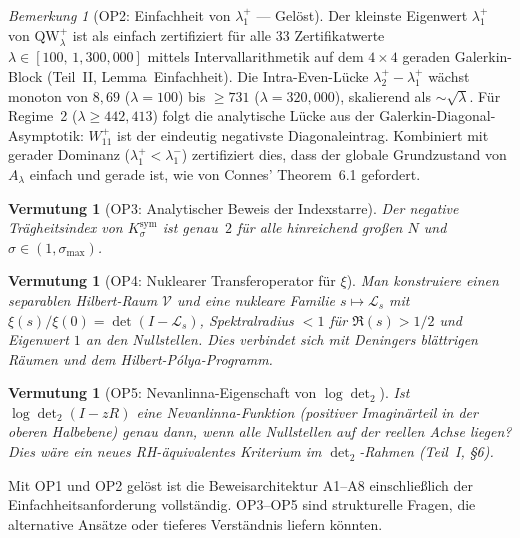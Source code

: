 \documentclass[12pt,a4paper]{article}
\newtheorem{conjecture}[theorem]{Vermutung}
\theoremstyle{definition}
\theoremstyle{remark}
\newtheorem{remark}[theorem]{Bemerkung}
\newcommand{\Ksym}{K_\sigma^{\mathrm{sym}}}
\begin{document}
\begin{remark}[OP2: Einfachheit von $\lambda_1^+$ --- Gelöst]
\label{rem:OP2-resolved}
Der kleinste Eigenwert $\lambda_1^+$ von $\mathrm{QW}_\lambda^+$ ist als einfach zertifiziert für alle $33$ Zertifikatwerte $\lambda \in [100,\, 1{,}300{,}000]$ mittels Intervallarithmetik auf dem $4 \times 4$ geraden Galerkin-Block (Teil~II, Lemma~Einfachheit). Die Intra-Even-Lücke $\lambda_2^+ - \lambda_1^+$ wächst monoton von $8{,}69$ ($\lambda = 100$) bis $\geq 731$ ($\lambda = 320{,}000$), skalierend als $\sim\!\sqrt{\lambda}$. Für Regime~2 ($\lambda \geq 442{,}413$) folgt die analytische Lücke aus der Galerkin-Diagonal-Asymptotik: $W_{11}^+$ ist der eindeutig negativste Diagonaleintrag. Kombiniert mit gerader Dominanz ($\lambda_1^+ < \lambda_1^-$) zertifiziert dies, dass der globale Grundzustand von $A_\lambda$ einfach und gerade ist, wie von Connes' Theorem~6.1 gefordert.
\end{remark}

\begin{conjecture}[OP3: Analytischer Beweis der Indexstarre]
\label{conj:OP3}
Der negative Trägheitsindex von $\Ksym$ ist genau~$2$ für alle hinreichend großen $N$ und $\sigma \in (1, \sigma_{\max})$.
\end{conjecture}

\begin{conjecture}[OP4: Nuklearer Transferoperator für $\xi$]
\label{conj:OP4}
Man konstruiere einen separablen Hilbert-Raum $\mathcal{V}$ und eine nukleare Familie $s \mapsto \mathcal{L}_s$ mit $\xi(s)/\xi(0) = \det(I - \mathcal{L}_s)$, Spektralradius $< 1$ für $\Re(s) > 1/2$ und Eigenwert $1$ an den Nullstellen. Dies verbindet sich mit Deningers blättrigen Räumen und dem Hilbert-P\'olya-Programm.
\end{conjecture}

\begin{conjecture}[OP5: Nevanlinna-Eigenschaft von $\log\det_2$]
\label{conj:OP5}
Ist $\log\det_2(I - zR)$ eine Nevanlinna-Funktion (positiver Imaginärteil in der oberen Halbebene) genau dann, wenn alle Nullstellen auf der reellen Achse liegen? Dies wäre ein neues RH-äquivalentes Kriterium im $\det_2$-Rahmen (Teil~I, \S6).
\end{conjecture}

\noindent Mit OP1 und OP2 gelöst ist die Beweisarchitektur A1--A8 einschließlich der Einfachheitsanforderung vollständig. OP3--OP5 sind strukturelle Fragen, die alternative Ansätze oder tieferes Verständnis liefern könnten.
\end{document}
